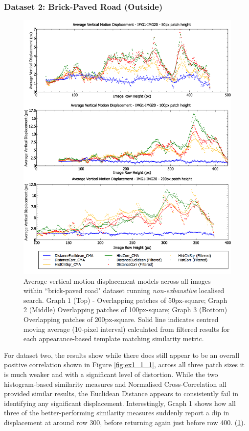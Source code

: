 \clearpage
\subsubsection{Dataset 2: Brick-Paved Road (Outside)}

\begin{figure}[ht!]
\centering
\includegraphics[scale=0.4]{images/results/ex1_results_outside_10cm}
\caption{Average vertical motion displacement models across all images within ``brick-paved road" dataset running \textit{non-exhaustive} localised search. Graph 1 (Top) - Overlapping patches of 50px-square; Graph 2 (Middle) Overlapping patches of 100px-square; Graph 3 (Bottom) Overlapping patches of 200px-square. Solid line indicates centred moving average (10-pixel interval) calculated from filtered results for each appearance-based template matching similarity metric.}
\label{fig:ex1_1_2}
\end{figure}

For dataset two, the results show while there does still appear to be an overall positive correlation shown in Figure \ref{fig:ex1_1_1}, across all three patch sizes it is much weaker and with a significant level of distortion. While the two histogram-based similarity measures and Normalised Cross-Correlation all provided similar results, the Euclidean Distance appears to consistently fail in identifying any significant displacement. Interestingly, Graph 1 shows how all three of the better-performing similarity measures suddenly report a dip in displacement at around row 300, before returning again just before row 400. (\ref{fig:ex1_1_2}).

